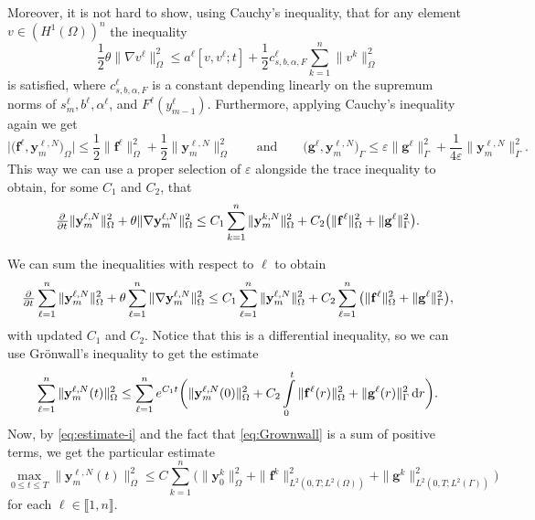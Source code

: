 \documentclass[11pt]{article}
\newcommand{\llb}{\llbracket}
\newcommand{\rrb}{\rrbracket}
\newcommand{\by}{\mathbf{y}}
\begin{document}
	Moreover, it is not hard to show, using Cauchy's inequality, that for any element \(v\in (H^1(\Omega))^n\) the inequality
	\[
		\frac{1}{2} \theta \|\nabla v^\ell \|^2_{\Omega}
		\leq a^\ell [v,v^\ell;t]  + \frac{1}{2} c_{s,b,\alpha,F}^\ell \sum_{k=1}^n \|v^k\|^2_{\Omega} 
	\]
	is satisfied, where \(c_{s,b,\alpha,F}^\ell\) is a constant depending linearly on the supremum norms of \(s_m^\ell, b^\ell, \alpha^\ell\), and \(F^\ell(y_{m-1}^\ell)\). Furthermore, applying Cauchy's inequality again we get
	\[
		\big| \big( \mathbf{f}^\ell , \by_m^{\ell,N} \big)_{\Omega} \big| \leq \frac{1}{2} \|\mathbf{f}^\ell \|^2_{\Omega} + \frac{1}{2} \|\by_m^{\ell,N}\|_{\Omega}^2
		\qquad\text{and}\qquad
		\big(\mathbf{g}^\ell ,  \by_m^{\ell,N} \big)_\Gamma
		\leq \varepsilon \|\mathbf{g}^\ell \|^2_{\Gamma} + \frac{1}{4\varepsilon} \|\by_m^{\ell,N}\|_{\Gamma}^2.
	\]
	This way we can use a proper selection of \(\varepsilon\) alongside the trace inequality to obtain, for some \(C_1\) and \(C_2\), that
	\[
		\pd{ }{t} \| \by_m^{\ell,N} \|^2_\Omega + \theta \|\nabla \by_m^{\ell,N}\|^2_{\Omega}
		\leq C_1 \sum_{k=1}^n \|\by_m^{k,N}\|^2_{\Omega} + C_2\big(\|\mathbf{f}^\ell \|^2_{\Omega} + \|\mathbf{g}^\ell \|^2_{\Gamma} \big).
	\]

	We can sum the inequalities with respect to \(\ell\) to obtain
	\begin{equation}
	\label{eq:estimate-differential}
		\pd{ }{t} \sum_{\ell=1}^n \| \by_m^{\ell,N} \|^2_\Omega + \theta \sum_{\ell=1}^n \| \nabla \by_m^{\ell,N}\|^2_{\Omega}
		\leq C_1 \sum_{\ell=1}^n \|\by_m^{\ell,N}\|^2_{\Omega} + C_2 \sum_{\ell=1}^n \big(\|\mathbf{f}^\ell\|^2_{\Omega} + \|\mathbf{g}^\ell\|^2_{\Gamma} \big),
	\end{equation}
	with updated \(C_1\) and \(C_2\).
	Notice that this is a differential inequality, so we can use Grönwall's inequality to get the estimate
	\begin{equation}
	\label{eq:Grownwall}
		\sum_{\ell=1}^n \| \by_m^{\ell,N} (t) \|^2_\Omega \leq \sum_{\ell=1}^n  e^{C_1 t} \bigg(  \| \by_m^{\ell,N} (0) \|^2_\Omega
			+ C_2 \int\limits_0^t \|\mathbf{f}^\ell (r)\|^2_{\Omega} + \|\mathbf{g}^\ell (r)\|^2_{\Gamma} \dif r
		\bigg).
	\end{equation}
	Now, by \eqref{eq:estimate-i} and the fact that \eqref{eq:Grownwall} is a sum of positive terms, we get the particular estimate
	\begin{equation}
	\label{eq:estimate-maxnorm}
		\max_{0\leq t \leq T} \| \by_m^{\ell,N} (t) \|^2_\Omega \leq C \sum_{k=1}^n  \bigg(  \| \by_0^k \|^2_\Omega
			+ \|\mathbf{f}^k\|^2_{L^2(0,T;L^2(\Omega))} + \|\mathbf{g}^k\|^2_{L^2(0,T;L^2(\Gamma))}
		\bigg)
	\end{equation}
	for each \(\ell \in \llb 1,n\rrb\).
	
\end{document}
